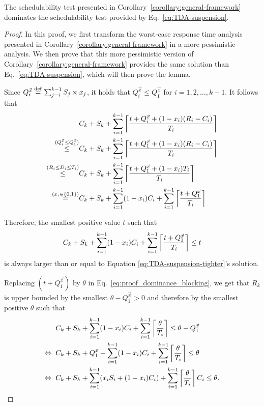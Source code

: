 \begin{Lemma}
  \label{lem:dominance_blocking}
  The schedulability test presented in
  Corollary~\ref{corollary:general-framework} dominates the
  schedulability test provided by Eq.~\eqref{eq:TDA-suspension}.
\end{Lemma}
\begin{proof}
  In this proof, we first transform the worst-case response time analysis presented in Corollary~\ref{corollary:general-framework} in a more pessimistic analysis. We then prove that this more pessimistic version of Corollary~\ref{corollary:general-framework} provides the same solution than Eq.~\eqref{eq:TDA-suspension}, which will then prove the lemma.
  
  Since $Q_i^{\vec{x}} \stackrel{\mathrm{def}}{=} \sum_{j=i}^{k-1} S_j \times x_j$, it holds that $Q_i^{\vec{x}} \leq  Q_1^{\vec{x}}$ for $i=1,2,\ldots,k-1$. It follows that
  \begin{align*}
  & C_k + S_k + \sum_{i=1}^{k-1}\left\lceil{\frac{t+Q_i^{\vec{x}}+(1-x_i)(R_i-C_i)}{T_i}}\right\rceil \\
  \stackrel{(Q_i^{\vec{x}} \leq  Q_1^{\vec{x}})}{\leq} & C_k + S_k + \sum_{i=1}^{k-1}\left\lceil{\frac{t+Q_1^{\vec{x}}+(1-x_i)(R_i-C_i)}{T_i}}\right\rceil \\
  \stackrel{(R_i \leq D_i \leq T_i)}{\leq} & C_k + S_k + \sum_{i=1}^{k-1}\left\lceil{\frac{t+Q_1^{\vec{x}}+(1-x_i)T_i}{T_i}}\right\rceil \\
  \stackrel{(x_i \in \{0,1\})}{=} & C_k + S_k + \sum_{i=1}^{k-1} (1-x_i)C_i + \sum_{i=1}^{k-1}\left\lceil{\frac{t+Q_1^{\vec{x}}}{T_i}}\right\rceil \\
  \end{align*}
  
  Therefore, the smallest positive value $t$ such that  
  \begin{equation}
  \label{eq:proof_dominance_blocking}
  C_k + S_k + \sum_{i=1}^{k-1} (1-x_i)C_i + \sum_{i=1}^{k-1}\ceiling{\frac{t+Q_1^{\vec{x}}}{T_i}} \leq t
  \end{equation}
  is always larger than or equal to Equation \eqref{eq:TDA-suspension-tighter}'s solution. 
  
  Replacing $(t+Q_1^{\vec{x}})$ by $\theta$ in Eq.~\eqref{eq:proof_dominance_blocking}, we get that $R_k$ is upper bounded by the smallest $\theta-Q_1^{\vec{x}} > 0$ and therefore by the smallest positive $\theta$ such that 
  \begin{align}
  & C_k + S_k + \sum_{i=1}^{k-1} (1-x_i)C_i + \sum_{i=1}^{k-1}\ceiling{\frac{\theta}{T_i}}\leq \theta-Q_1^{\vec{x}} \nonumber \\
  \Leftrightarrow \;\; & C_k + S_k + Q_1^{\vec{x}} + \sum_{i=1}^{k-1} (1-x_i)C_i + \sum_{i=1}^{k-1}\ceiling{\frac{\theta}{T_i}}\leq \theta \nonumber \\
\Leftrightarrow \;\; & C_k + S_k + \sum_{i=1}^{k-1}(x_i S_i + (1-x_i) C_i) + \sum_{i=1}^{k-1}\ceiling{\frac{\theta}{T_i}}C_i \leq \theta \label{eq:proof_dominance_blocking_final}.
    \end{align}
    

\end{proof}
